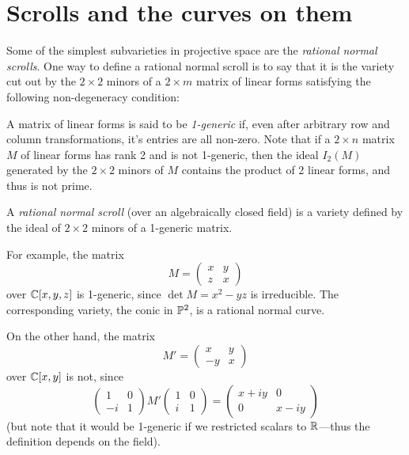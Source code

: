

\chapter{Scrolls and the curves on them}
\label{ScrollsChapter}

Some of the simplest subvarieties in projective space are the \emph{rational normal scrolls}. One way to define a rational normal scroll is to say that it is the variety cut out by the $2\times 2$ minors of a $2\times m$ matrix of linear forms satisfying the following non-degeneracy condition: 
\begin{definition}
 A matrix of linear forms is said to be \emph{1-generic} if, even after arbitrary row and column transformations, it's entries are all non-zero. Note that if a $2\times n$ matrix
 $M$ of linear forms has rank 2 and is not 1-generic, then the ideal $I_2(M)$ generated by the $2\times 2$ minors of $M$ contains the product of 2 linear forms, and thus is not prime.
\end{definition}

\begin{definition}
A \emph{rational normal scroll} (over an algebraically closed field) is a variety defined by the ideal of $2\times 2$ minors
of a 1-generic matrix. 
\end{definition}
For example, the matrix 
$$
M = \begin{pmatrix}
 x &y\\
 z&x
\end{pmatrix}
$$
over ${\mathbb C}[x,y,z]$ is  1-generic, since
$\det M = x^2-yz$ is irreducible. The corresponding variety, the conic in ${\mathbb P}^2$,
is a rational normal curve.

On the other hand, the matrix
$$
M' = \begin{pmatrix}
 x &y\\
 -y&x
\end{pmatrix}
$$
over ${\mathbb C}[x,y]$ is not, since
$$
\begin{pmatrix}
1&0\\
-i&1 
\end{pmatrix}
M'
\begin{pmatrix}
 1&0\\
 i&1
\end{pmatrix}
= 
\begin{pmatrix}
 x+iy&0\\
 0&x-iy
\end{pmatrix}
$$
(but note that it would be 1-generic if we restricted scalars to ${\mathbb R}$---thus the definition depends on the field).

